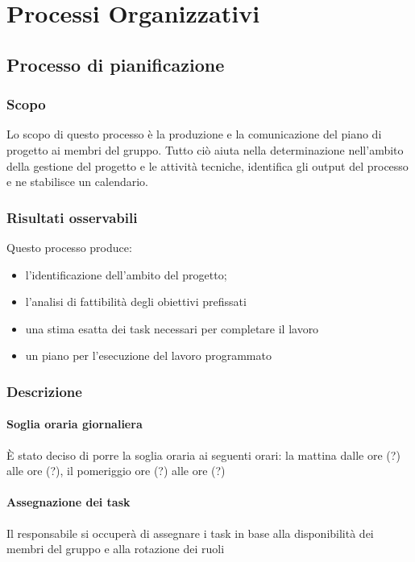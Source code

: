 
\section{Processi Organizzativi}

\subsection{Processo di pianificazione}

\subsubsection{Scopo}

Lo scopo di questo processo è la produzione e la comunicazione del piano di progetto ai membri del gruppo. Tutto ciò aiuta nella determinazione nell'ambito della gestione del progetto e le attività tecniche, identifica gli output del processo e ne stabilisce un calendario.


\subsubsection{Risultati osservabili}

Questo processo produce:
\begin{itemize}

\item l'identificazione dell'ambito del progetto;
\item l'analisi di fattibilità degli obiettivi prefissati
\item una stima esatta dei task necessari per completare il lavoro
\item un piano per l'esecuzione del lavoro programmato

\end{itemize}

\subsubsection{Descrizione}

\paragraph*{Soglia oraria giornaliera}È stato deciso di porre la soglia oraria ai seguenti orari: la mattina dalle ore (?) alle ore (?), il pomeriggio  ore (?) alle ore (?) %

\paragraph*{Assegnazione dei task}Il responsabile si occuperà di assegnare i task in base alla disponibilità dei membri del gruppo e alla rotazione dei ruoli

